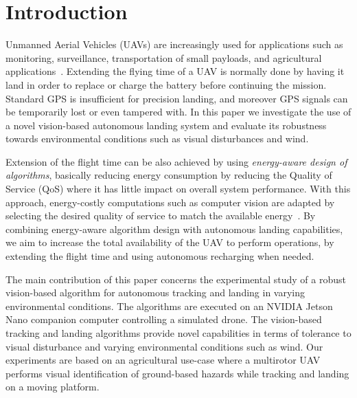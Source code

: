 \documentclass[conference]{IEEEtran}
\begin{document}
\section{Introduction}
\label{sec:introduction}

Unmanned Aerial Vehicles (UAVs) are increasingly used for applications
such as monitoring, surveillance, transportation of small payloads,
and agricultural applications~\cite{costa2012use,salami2014uav}.
%
Extending the flying time of a UAV is normally done by having it land
in order to replace or charge the battery before continuing the
mission. 
%
Standard GPS is insufficient for precision landing, and moreover
GPS signals can be temporarily lost or even tampered with. 
In this paper we investigate the use of a novel
vision-based autonomous landing system and evaluate its robustness
towards environmental conditions such as visual disturbances and wind.

Extension of the flight time can be also achieved by using
\emph{energy-aware design of algorithms}, basically reducing energy consumption
by reducing the Quality of Service (QoS) where it has little impact on overall system performance. With this approach,
energy-costly computations such as computer vision are adapted by
selecting the desired quality of service to match the available
energy~\cite{seewald2020mechanical}. By combining energy-aware algorithm design with autonomous landing
capabilities, we aim to increase the total availability of the UAV to
perform operations, by extending the flight time and using autonomous
recharging when needed.


The main contribution of this paper concerns the experimental study of
a robust vision-based algorithm for autonomous
tracking and landing in varying environmental conditions. The
algorithms are executed on an NVIDIA Jetson Nano companion computer
controlling a simulated drone. The vision-based tracking and landing
algorithms provide novel capabilities in terms of tolerance to visual
disturbance and varying environmental conditions such as wind.
%
Our experiments are based on an agricultural use-case where a
multirotor UAV performs visual identification of ground-based hazards
while tracking and landing on a moving platform.
%
\end{document}
